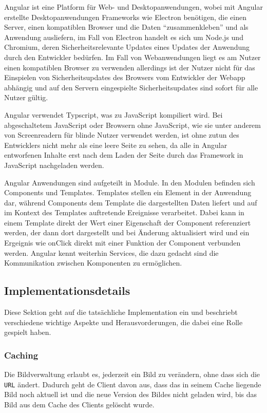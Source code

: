 Angular ist eine Platform für Web- und Desktopanwendungen, wobei mit Angular
erstellte Desktopanwendungen Frameworks wie Electron benötigen, die einen
Server, einen kompatiblen Browser und die Daten ``zusammenkleben'' und als
Anwendung ausliefern, im Fall von Electron handelt es sich um Node.js und
Chromium, deren Sicherheitsrelevante Updates eines Updates der Anwendung durch
den Entwickler bedürfen. Im Fall von Webanwendungen liegt es am Nutzer einen
kompatiblen Browser zu verwenden allerdings ist der Nutzer nicht für das
Einspielen von Sicherheitsupdates des Browsers vom Entwickler der Webapp
abhängig und auf den Servern eingespielte Sicherheitsupdates sind sofort für
alle Nutzer gültig.

Angular verwendet Typscript, was zu JavaScript kompiliert wird. Bei
abgeschaltetem JavaScript oder Browsern ohne JavaScript, wie sie unter anderem
von Screenreadern für blinde Nutzer verwendet werden, ist ohne zutun des
Entwicklers nicht mehr als eine leere Seite zu sehen, da alle in Angular
entworfenen Inhalte erst nach dem Laden der Seite durch das Framework in
JavaScript nachgeladen werden.

Angular Anwendungen sind aufgeteilt in Module. In den Modulen befinden sich
Components und Templates. Templates stellen ein Element in der Anwendung dar,
während Components dem Template die dargestellten Daten liefert und auf im
Kontext des Templates auftretende Ereignisse verarbeitet. Dabei kann in einem
Template direkt der Wert einer Eigenschaft der Component referenziert werden,
der dann dort dargestellt und bei Änderung aktualisiert wird und ein Ergeignis
wie onClick direkt mit einer Funktion der Component verbunden werden. Angular
kennt weiterhin Services, die dazu gedacht sind die Kommunikation zwischen
Komponenten zu ermöglichen.

\subsection{Implementationsdetails}

Diese Sektion geht auf die tatsächliche Implementation ein und beschriebt
verschiedene wichtige Aspekte und Herausvorderungen, die dabei eine Rolle
gespielt haben.

\subsubsection{Caching}

Die Bildverwaltung erlaubt es, jederzeit ein Bild zu verändern, ohne dass sich
die \texttt{URL} ändert. Dadurch geht de Client davon aus, dass das in seinem
Cache liegende Bild noch aktuell ist und die neue Version des Bildes nicht
geladen wird, bis das Bild aus dem Cache des Clients gelöscht wurde.


